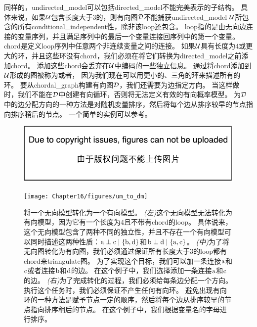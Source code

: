 同样的，\gls{undirected_model}可以包括\gls{directed_model}不能完美表示的子结构。
具体来说，如果$\mathcal{U}$包含长度大于$3$的，则有向图$\mathcal{D}$不能捕获\gls{undirected_model} $\mathcal{U}$所包含的所有\gls{conditional_independent}性，除非该\gls{loop}还包含。
\gls{loop}指的是由无向边连接的变量序列，并且满足序列中的最后一个变量连接回序列中的第一个变量。
\gls{chord}是定义\gls{loop}序列中任意两个非连续变量之间的连接。
如果$\mathcal{U}$具有长度为$4$或更大的环，并且这些环没有\gls{chord}，我们必须在将它们转换为\gls{directed_model}之前添加\gls{chord}。
添加这些\gls{chord}会丢弃在$\mathcal{U}$中编码的一些独立信息。
通过将\gls{chord}添加到$\mathcal{U}$形成的图被称为或者，
因为我们现在可以用更小的、三角的环来描述所有的环。
要从\gls{chordal_graph}构建有向图$\mathcal{D}$，我们还需要为边指定方向。
当这样做时，我们不能在$\mathcal{D}$中创建有向循环，否则将无法定义有效的有向概率模型。
为$\mathcal{D}$中的边分配方向的一种方法是对随机变量排序，然后将每个边从排序较早的节点指向排序稍后的节点。
一个简单的实例可以参考。



\begin{figure}[!htb]
\ifOpenSource
\centerline{\includegraphics{figure.pdf}}
\else
	\centerline{\texttt{[image: Chapter16/figures/um\_to\_dm]}}	
\fi
\caption{将一个无向模型转化为一个有向模型。
\emph{(左)}这个无向模型无法转化为有向模型，因为它有一个长度为$4$且不带有\gls{chord}的\gls{loop}。
具体说来，这个无向模型包含了两种不同的独立性，并且不存在一个有向模型可以同时描述这两种性质：$\mathrm{a}\perp \mathrm{c} \mid \{\mathrm{b},\mathrm{d}\}$和$\mathrm{b} \perp \mathrm{d} \mid \{\mathrm{a},\mathrm{c}\}$。
\emph{(中)}为了将无向图转化为有向图，我们必须通过保证所有长度大于$3$的\gls{loop}都有\gls{chord}来\gls{triangulate}图。
为了实现这个目标，我们可以加一条连接$\mathrm{a}$和$\mathrm{c}$或者连接$\mathrm{b}$和$\mathrm{d}$的边。
在这个例子中，我们选择添加一条连接$\mathrm{a}$和$\mathrm{c}$的边。
\emph{(右)}为了完成转化的过程，我们必须给每条边分配一个方向。
执行这个任务时，我们必须保证不产生任何有向环。
避免出现有向环的一种方法是赋予节点一定的顺序，然后将每个边从排序较早的节点指向排序稍后的节点。
在这个例子中，我们根据变量名的字母进行排序。}
	\label{fig:um_to_dm}
\end{figure}



